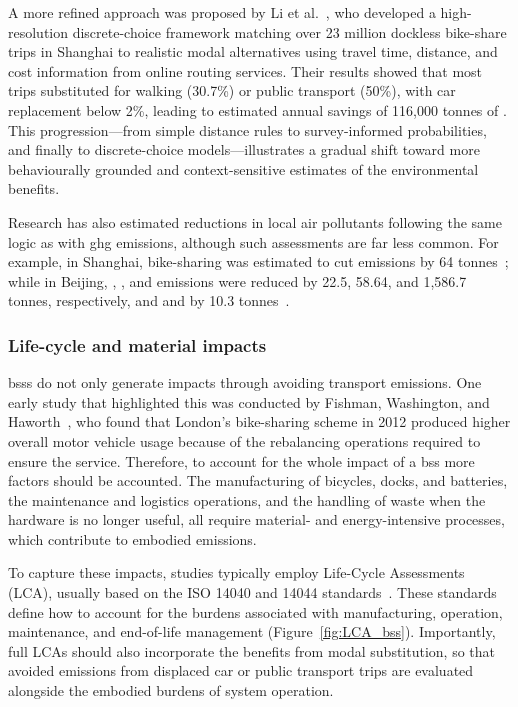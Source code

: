         A more refined approach was proposed by Li et al.~\cite{Liu2021}, who developed a high-resolution discrete-choice framework matching over 23 million dockless bike-share trips in Shanghai to realistic modal alternatives using travel time, distance, and cost information from online routing services. Their results showed that most trips substituted for walking (30.7\%) or public transport (50\%), with car replacement below 2\%, leading to estimated annual savings of 116,000 tonnes of . This progression—from simple distance rules to survey-informed probabilities, and finally to discrete-choice models—illustrates a gradual shift toward more behaviourally grounded and context-sensitive estimates of the environmental benefits.

        Research has also estimated reductions in local air pollutants following the same logic as with \ac{ghg} emissions, although such assessments are far less common. For example, in Shanghai, bike-sharing was estimated to cut  emissions by 64 tonnes~\cite{Zhang2018}; while in Beijing, , , and  emissions were reduced by 22.5, 58.64, and 1,586.7 tonnes, respectively, and  and  by 10.3 tonnes~\cite{Qiu2018}.


        \subsubsection{Life-cycle and material impacts}

        \acp{bss} do not only generate impacts through avoiding transport emissions. One early study that highlighted this was conducted by Fishman, Washington, and Haworth~\cite{Fishman2014}, who found that London’s bike-sharing scheme in 2012 produced higher overall motor vehicle usage because of the rebalancing operations required to ensure the service. Therefore, to account for the whole impact of a \ac{bss} more factors should be accounted. The manufacturing of bicycles, docks, and batteries, the maintenance and logistics operations, and the handling of waste when the hardware is no longer useful, all require material- and energy-intensive processes, which contribute to embodied emissions.

        To capture these impacts, studies typically employ Life-Cycle Assessments (LCA), usually based on the ISO 14040 and 14044 standards~\cite{LCA2006a, LCA2006b}. These standards define how to account for the burdens associated with manufacturing, operation, maintenance, and end-of-life management (Figure~\ref{fig:LCA_bss}). Importantly, full LCAs should also incorporate the benefits from modal substitution, so that avoided emissions from displaced car or public transport trips are evaluated alongside the embodied burdens of system operation.
        
